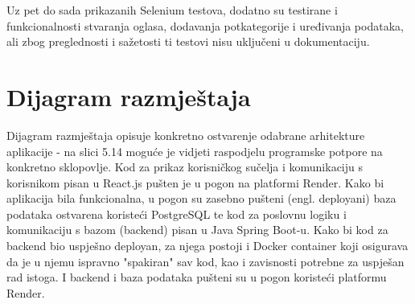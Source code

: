                 Uz pet do sada prikazanih Selenium testova, dodatno su testirane i funkcionalnosti stvaranja oglasa, dodavanja potkategorije i uređivanja podataka, ali zbog preglednosti i sažetosti ti testovi nisu uključeni u dokumentaciju. 

                \eject
			
			 
			
		
		
		\section{Dijagram razmještaja}
			

                Dijagram razmještaja opisuje konkretno ostvarenje odabrane arhitekture aplikacije - na slici 5.14 moguće je vidjeti raspodjelu programske potpore na konkretno sklopovlje. Kod za prikaz korisničkog sučelja i komunikaciju s korisnikom pisan u React.js pušten je u pogon na platformi Render. Kako bi aplikacija bila funkcionalna, u pogon su zasebno pušteni (engl. deployani) baza podataka ostvarena koristeći PostgreSQL te kod za poslovnu logiku i komunikaciju s bazom (backend) pisan u Java Spring Boot-u. Kako bi kod za backend bio uspješno deployan, za njega postoji i Docker container koji osigurava da je u njemu ispravno "spakiran" sav kod, kao i zavisnosti potrebne za uspješan rad istoga. I backend i baza podataka pušteni su u pogon koristeći platformu Render. \\

